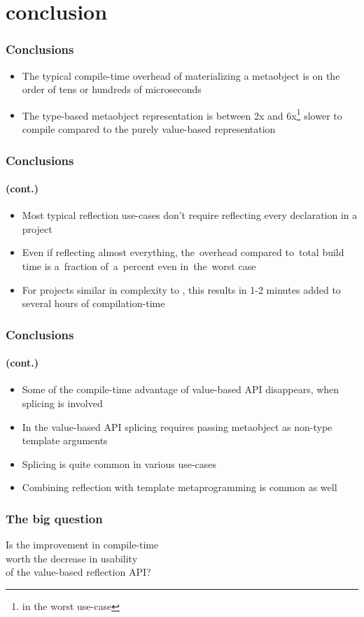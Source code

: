 \documentclass[compress,table,xcolor=table]{beamer}
\begin{document}
\section{conclusion}
\begin{frame}
  \frametitle{Conclusions}
  \Large
  \begin{itemize}
    \item The typical compile-time overhead of materializing a metaobject
      is on the order of tens or hundreds of microseconds
    \item The type-based metaobject representation is between 2x and 6x\footnote{
        in the worst  use-case}
      slower to compile compared to the purely value-based representation
  \end{itemize}
\end{frame}
\begin{frame}
  \frametitle{Conclusions}
  \framesubtitle{(cont.)}
  \Large
  \begin{itemize}
    \item Most typical reflection use-cases don't require reflecting every
      declaration in a project
    \item Even if reflecting almost everything, the~overhead compared
      to~total build time is a~fraction of~a~percent even in~the~worst case
    \item For projects similar in complexity to ,
      this results in 1-2 minutes added to several hours of compilation-time
  \end{itemize}
\end{frame}
\begin{frame}
  \frametitle{Conclusions}
  \framesubtitle{(cont.)}
  \Large
  \begin{itemize}
    \item Some of the compile-time advantage of value-based API disappears,
      when splicing is involved
    \item In the value-based API splicing requires passing metaobject
      as non-type template arguments
    \item Splicing is quite common in various use-cases
    \item Combining reflection with template metaprogramming is common as well
  \end{itemize}
\end{frame}
\begin{frame}
  \frametitle{The {\larger big} question}
  \LARGE
  \centering
  Is the improvement in compile-time\\
  worth the decrease in usability\\
  of the value-based reflection API?
\end{frame}
\end{document}
